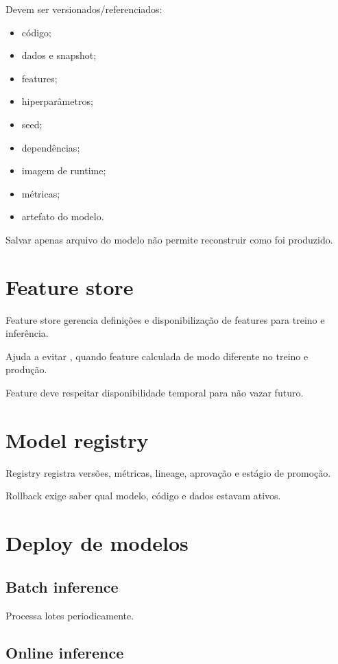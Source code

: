 Devem ser versionados/referenciados:
\begin{itemize}
\item código;
\item dados e snapshot;
\item features;
\item hiperparâmetros;
\item seed;
\item dependências;
\item imagem de runtime;
\item métricas;
\item artefato do modelo.
\end{itemize}

Salvar apenas arquivo do modelo não permite reconstruir como foi produzido.

\section{Feature store}

Feature store gerencia definições e disponibilização de features para treino e inferência.

Ajuda a evitar , quando feature calculada de modo diferente no treino e produção.

Feature deve respeitar disponibilidade temporal para não vazar futuro.

\section{Model registry}

Registry registra versões, métricas, lineage, aprovação e estágio de promoção.

Rollback exige saber qual modelo, código e dados estavam ativos.

\section{Deploy de modelos}

\subsection{Batch inference}

Processa lotes periodicamente.

\subsection{Online inference}

